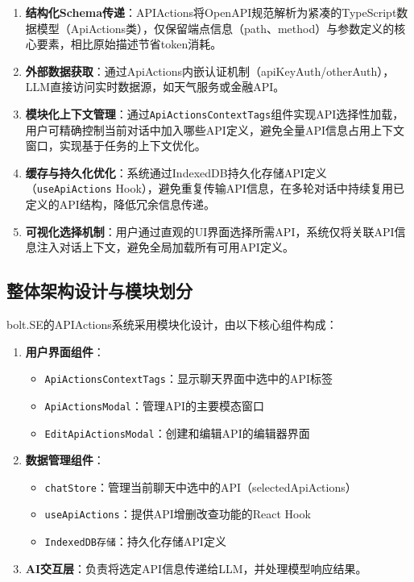\begin{enumerate}
  \item \textbf{结构化Schema传递}：APIActions将OpenAPI规范解析为紧凑的TypeScript数据模型（ApiActions类），仅保留端点信息（path、method）与参数定义的核心要素，相比原始描述节省token消耗。
  
  \item \textbf{外部数据获取}：通过ApiActions内嵌认证机制（apiKeyAuth/otherAuth），LLM直接访问实时数据源，如天气服务或金融API。
  
  \item \textbf{模块化上下文管理}：通过\texttt{ApiActionsContextTags}组件实现API选择性加载，用户可精确控制当前对话中加入哪些API定义，避免全量API信息占用上下文窗口，实现基于任务的上下文优化。
  
  \item \textbf{缓存与持久化优化}：系统通过IndexedDB持久化存储API定义（\texttt{useApiActions} Hook），避免重复传输API信息，在多轮对话中持续复用已定义的API结构，降低冗余信息传递。
  
  \item \textbf{可视化选择机制}：用户通过直观的UI界面选择所需API，系统仅将关联API信息注入对话上下文，避免全局加载所有可用API定义。
\end{enumerate}

\subsection{整体架构设计与模块划分}
bolt.SE的APIActions系统采用模块化设计，由以下核心组件构成：

\begin{enumerate}
  \item \textbf{用户界面组件}：
    \begin{itemize}
      \item \texttt{ApiActionsContextTags}：显示聊天界面中选中的API标签
      \item \texttt{ApiActionsModal}：管理API的主要模态窗口
      \item \texttt{EditApiActionsModal}：创建和编辑API的编辑器界面
    \end{itemize}
  
  \item \textbf{数据管理组件}：
    \begin{itemize}
      \item \texttt{chatStore}：管理当前聊天中选中的API（selectedApiActions）
      \item \texttt{useApiActions}：提供API增删改查功能的React Hook
      \item \texttt{IndexedDB存储}：持久化存储API定义
    \end{itemize}
  
  \item \textbf{AI交互层}：负责将选定API信息传递给LLM，并处理模型响应结果。
\end{enumerate}

